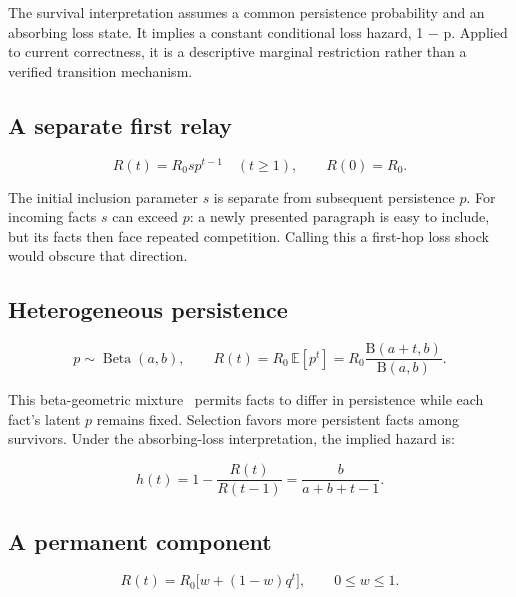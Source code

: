\documentclass[10pt,letterpaper]{amsart}
\numberwithin{equation}{section}
\begin{document}
The survival interpretation assumes a common persistence probability and an absorbing loss
state. It implies a constant conditional loss hazard, 1 \ensuremath{-} p. Applied to
current correctness, it is a descriptive marginal restriction rather than a verified
transition mechanism.

\subsection*{A separate first relay}

\begin{equation}
  \label{eq:first-relay}
  R(t) = R_0 s p^{t-1} \quad (t \geq 1), \qquad R(0)=R_0.
\end{equation}

The initial inclusion parameter $s$ is separate from subsequent persistence $p$. For
incoming facts $s$ can exceed $p$: a newly presented paragraph is easy to include, but its
facts then face repeated competition. Calling this a first-hop loss shock would obscure
that direction.

\subsection*{Heterogeneous persistence}

\begin{equation}
  \label{eq:beta-geometric}
  p \sim \operatorname{Beta}(a,b), \qquad R(t) = R_0 \,\mathbb{E}[p^t]
    = R_0 \frac{\mathrm{B}(a+t,b)}{\mathrm{B}(a,b)}.
\end{equation}

This beta-geometric mixture~\cite{faderHardie2006} permits facts to differ in persistence
while each fact's latent $p$ remains fixed. Selection favors more persistent facts among
survivors. Under the absorbing-loss interpretation, the implied hazard is:

\begin{equation}
  \label{eq:beta-hazard}
  h(t) = 1 - \frac{R(t)}{R(t-1)} = \frac{b}{a+b+t-1}.
\end{equation}

\subsection*{A permanent component}

\begin{equation}
  \label{eq:cure}
  R(t) = R_0 \bigl[w + (1-w)q^t\bigr], \qquad 0 \leq w \leq 1.
\end{equation}
\end{document}
